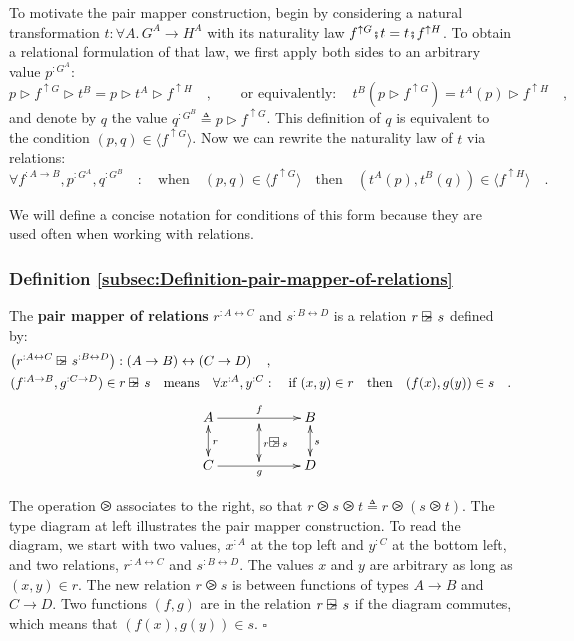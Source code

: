 To motivate the pair mapper construction, begin by considering a natural
transformation $t:\forall A.\,G^{A}\rightarrow H^{A}$ with its naturality
law $f^{\uparrow G}\bef t=t\bef f^{\uparrow H}$. To obtain a relational
formulation of that law, we first apply both sides to an arbitrary
value $p^{:G^{A}}$:
\[
p\triangleright f^{\uparrow G}\triangleright t^{B}=p\triangleright t^{A}\triangleright f^{\uparrow H}\quad,\quad\quad\text{or equivalently}:\quad t^{B}(p\triangleright f^{\uparrow G})=t^{A}(p)\triangleright f^{\uparrow H}\quad,
\]
and denote by $q$ the value $q^{:G^{B}}\triangleq p\triangleright f^{\uparrow G}$.
This definition of $q$ is equivalent to the condition $(p,q)\in\langle f^{\uparrow G}\rangle$.
Now we can rewrite the naturality law of $t$ via relations: 
\begin{equation}
\forall f^{:A\rightarrow B},p^{:G^{A}},q^{:G^{B}}\quad:\quad\text{when}\quad(p,q)\in\langle f^{\uparrow G}\rangle\quad\text{then}\quad(t^{A}(p),t^{B}(q))\in\langle f^{\uparrow H}\rangle\quad.\label{eq:naturality-law-of-t-derivation1}
\end{equation}

We will define a concise notation for conditions of this form because
they are used often when working with relations.

\subsubsection{Definition \label{subsec:Definition-pair-mapper-of-relations}\ref{subsec:Definition-pair-mapper-of-relations}}

The \textbf{pair mapper of relations}
$r^{:A\leftrightarrow C}$ and $s^{:B\leftrightarrow D}$ is a relation
$r\varogreaterthan s$ defined by:
\begin{align*}
 & \big(r^{:A\leftrightarrow C}\varogreaterthan s^{:B\leftrightarrow D}\big):\left(A\rightarrow B\right)\leftrightarrow\left(C\rightarrow D\right)\quad,\\
 & (f^{:A\rightarrow B},g^{:C\rightarrow D})\in r\varogreaterthan s\quad\text{means}\quad\forall x^{:A},y^{:C}:\quad\text{if }(x,y)\in r\quad\text{then}\quad(f(x),g(y))\in s\quad.
\end{align*}
\[
\xymatrix{\xyScaleY{1.8pc}\xyScaleX{2.2pc}A\ar@{<->}[d]\sp(0.5){r}\ar[rr]\sp(0.5){f} & \ar@{<->}[d(0.9)]\sp(0.55){r\varogreaterthan s} & B\ar@{<->}[d]\sp(0.5){s}\\
C\ar[rr]\sb(0.5){g} &  & D
}
\]

\noindent The operation $\ogreaterthan$ associates to the right,
so that $r\ogreaterthan s\ogreaterthan t\triangleq r\ogreaterthan\left(s\ogreaterthan t\right)$.
The type diagram at left illustrates the pair mapper construction.
To read the diagram, we start with two values, $x^{:A}$ at the top
left and $y^{:C}$ at the bottom left, and two relations, $r^{:A\leftrightarrow C}$
and $s^{:B\leftrightarrow D}$. The values $x$ and $y$ are arbitrary
as long as $(x,y)\in r$. The new relation $r\ogreaterthan s$ is
between functions of types $A\rightarrow B$ and $C\rightarrow D$.
Two functions $\left(f,g\right)$ are in the relation $r\varogreaterthan s$
if the diagram commutes, which means that $(f(x),g(y))\in s$. $\square$


